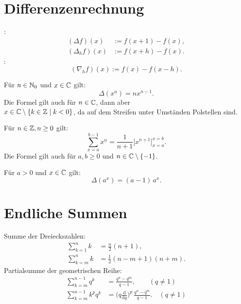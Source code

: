 \section{Differenzenrechnung}
\begin{definition}[Differenzoperator]\mbox{}\newline
{}:
\begin{align}
(\Delta f)(x) &:= f(x+1)-f(x),\\
(\Delta_h f)(x) &:= f(x+h)-f(x).
\end{align}
:
\begin{equation}
(\nabla_h f)(x) := f(x)-f(x-h).
\end{equation}
\end{definition}
\noindent
Für $n\in\mathbb N_0$ und $x\in\mathbb C$ gilt:
\begin{equation}
\Delta(x^{\underline{n}}) = nx^{\underline{n-1}}.
\end{equation}
Die Formel gilt auch für $n\in\mathbb C$, dann aber\\
$x\in\mathbb C\setminus\{k\in\mathbb Z\mid k<0\}$, da auf dem Streifen unter
Umständen Polstellen sind.

Für $n\in\mathbb Z,n\ge 0$ gilt:
\begin{equation}
\sum_{x=a}^{b-1} x^{\underline n} = \frac{1}{n+1}\big[x^{\underline{n+1}}\big]_{x=a}^{x=b}.
\end{equation}
Die Formel gilt auch für $a,b\ge 0$ und $n\in\mathbb C\setminus\{-1\}$.

Für $a>0$ und $x\in\mathbb C$ gilt:
\begin{equation}
\Delta(a^x) = (a-1)\,a^x.
\end{equation}

\section{Endliche Summen}
Summe der Dreieckszahlen:
\begin{align}
\sum_{k=1}^n k &= \frac{n}{2}(n+1),\\
\sum_{k=m}^n k &= \frac{1}{2}(n-m+1)(n+m).
\end{align}
Partialsumme der geometrischen Reihe:
\begin{align}
\sum_{k=m}^{n-1} q^k &= \frac{q^n-q^m}{q-1},\qquad (q\ne 1)\\
\sum_{k=m}^{n-1} k^p q^k
&= \Big(q\frac{\mathrm d}{\mathrm dq}\Big)^p\,\frac{q^n-q^m}{q-1}.\quad (q\ne 1)
\end{align}

\newpage
